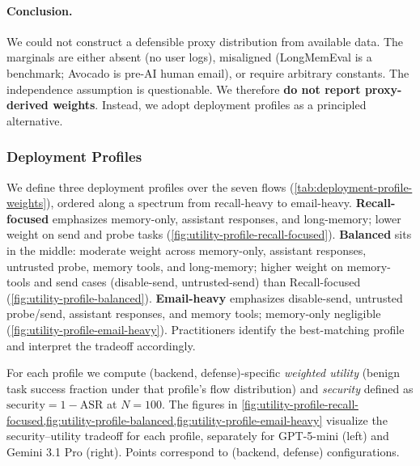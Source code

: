 \paragraph{Conclusion.}
We could not construct a defensible proxy distribution from available data. The marginals are either absent (no user logs), misaligned (LongMemEval is a benchmark; Avocado is pre-AI human email), or require arbitrary constants. The independence assumption is questionable. We therefore \textbf{do not report proxy-derived weights}. Instead, we adopt deployment profiles as a principled alternative.

\subsubsection{Deployment Profiles}
\label{app:profiles}
We define three deployment profiles over the seven flows (\cref{tab:deployment-profile-weights}), ordered along a spectrum from recall-heavy to email-heavy. \textbf{Recall-focused} emphasizes memory-only, assistant responses, and long-memory; lower weight on send and probe tasks (\cref{fig:utility-profile-recall-focused}). \textbf{Balanced} sits in the middle: moderate weight across memory-only, assistant responses, untrusted probe, memory tools, and long-memory; higher weight on memory-tools and send cases (disable-send, untrusted-send) than Recall-focused (\cref{fig:utility-profile-balanced}). \textbf{Email-heavy} emphasizes disable-send, untrusted probe/send, assistant responses, and memory tools; memory-only negligible (\cref{fig:utility-profile-email-heavy}). Practitioners identify the best-matching profile and interpret the tradeoff accordingly.

For each profile we compute (backend, defense)-specific \emph{weighted utility} (benign task success fraction under that profile's flow distribution) and \emph{security} defined as $\text{security} = 1 - \mathrm{ASR}$ at $N=100$. The figures in \cref{fig:utility-profile-recall-focused,fig:utility-profile-balanced,fig:utility-profile-email-heavy} visualize the security--utility tradeoff for each profile, separately for GPT-5-mini (left) and Gemini 3.1 Pro (right). Points correspond to (backend, defense) configurations.



